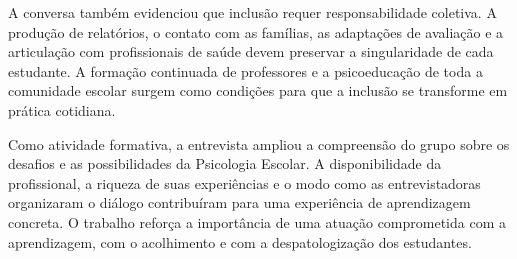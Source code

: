 \documentclass[12pt,a4paper,oneside]{abntex2}
\begin{document}
A conversa também evidenciou que inclusão requer responsabilidade coletiva. A produção de relatórios, o contato com as famílias, as adaptações de avaliação e a articulação com profissionais de saúde devem preservar a singularidade de cada estudante. A formação continuada de professores e a psicoeducação de toda a comunidade escolar surgem como condições para que a inclusão se transforme em prática cotidiana.

Como atividade formativa, a entrevista ampliou a compreensão do grupo sobre os desafios e as possibilidades da Psicologia Escolar. A disponibilidade da profissional, a riqueza de suas experiências e o modo como as entrevistadoras organizaram o diálogo contribuíram para uma experiência de aprendizagem concreta. O trabalho reforça a importância de uma atuação comprometida com a aprendizagem, com o acolhimento e com a despatologização dos estudantes.
\end{document}
